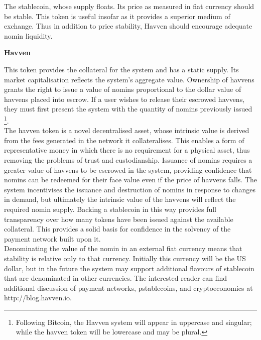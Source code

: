 \noindent The stablecoin, whose supply floats. Its price as measured in fiat
currency should be stable. This token is useful insofar as it provides a
superior medium of exchange. Thus in addition to price stability, Havven
should encourage adequate nomin liquidity.

\vspace{2mm}

\noindent \textbf{Havven}

\vspace{1mm}

\noindent This token provides the collateral for the system and has a static
supply. Its market capitalisation reflects the system’s aggregate value.
Ownership of havvens grants the right to issue a value of nomins proportional
to the dollar value of havvens placed into escrow. If a user wishes to
release their escrowed havvens, they must first present the system with the
quantity of nomins previously issued \footnote{Following Bitcoin, the Havven
system will appear in uppercase and singular; while the havven token will be
lowercase and may be plural.}. \\

\noindent The havven token is a novel decentralised asset, whose intrinsic
value is derived from the fees generated in the network it collateralises.
This enables a form of representative money in which there is no requirement
for a physical asset, thus removing the problems of trust and custodianship.
Issuance of nomins requires a greater value of havvens to be escrowed in the
system, providing confidence that nomins can be redeemed for their face value
even if the price of havvens falls. The system incentivises the issuance and
destruction of nomins in response to changes in demand, but ultimately the
intrinsic value of the havvens will reflect the required nomin supply.
Backing a stablecoin in this way provides full transparency over how many
tokens have been issued against the available collateral. This provides a
solid basis for confidence in the solvency of the payment network built upon
it.\\

\noindent Denominating the value of the nomin in an external fiat currency
means that stability is relative only to that currency. Initially this
currency will be the US dollar, but in the future the system may support
additional flavours of stablecoin that are denominated in other currencies.
The interested reader can find additional discussion of payment networks,
pstablecoins, and cryptoeconomics at http://blog.havven.io.\pagebreak
